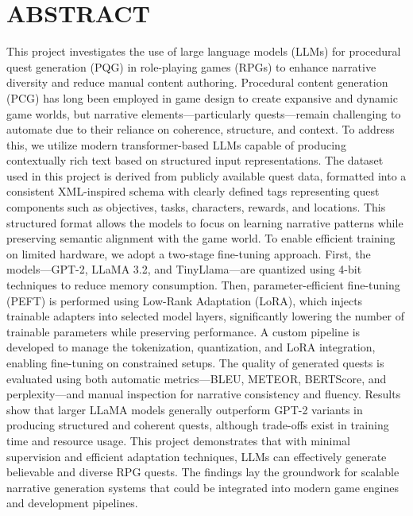 \clearpage

\section*{\centering \large ABSTRACT}

\vspace{2em}

\begin{doublespace}
  \justifying
  \noindent
  This project investigates the use of large language models (LLMs) for procedural quest
  generation (PQG) in role-playing games (RPGs) to enhance narrative diversity and reduce
  manual content authoring. Procedural content generation (PCG) has long been
  employed in game design to create expansive and dynamic game worlds, but narrative
  elements—particularly quests—remain challenging to automate due to their reliance on
  coherence, structure, and context. To address this, we utilize modern transformer-based
  LLMs capable of producing contextually rich text based on structured input representations.
  The dataset used in this project is derived from publicly available quest data,
  formatted into a consistent XML-inspired schema with clearly defined tags representing
  quest components such as objectives, tasks, characters, rewards, and locations. This structured
  format allows the models to focus on learning narrative patterns while preserving
  semantic alignment with the game world. To enable efficient training on limited hardware,
  we adopt a two-stage fine-tuning approach. First, the models—GPT-2, LLaMA 3.2,
  and TinyLlama—are quantized using 4-bit techniques to reduce memory consumption.
  Then, parameter-efficient fine-tuning (PEFT) is performed using Low-Rank Adaptation
  (LoRA), which injects trainable adapters into selected model layers, significantly lowering
  the number of trainable parameters while preserving performance. A custom pipeline
  is developed to manage the tokenization, quantization, and LoRA integration, enabling
  fine-tuning on constrained setups. The quality of generated quests is evaluated using
  both automatic metrics—BLEU, METEOR, BERTScore, and perplexity—and manual
  inspection for narrative consistency and fluency. Results show that larger LLaMA models
  generally outperform GPT-2 variants in producing structured and coherent quests,
  although trade-offs exist in training time and resource usage. This project demonstrates
  that with minimal supervision and efficient adaptation techniques, LLMs can effectively
  generate believable and diverse RPG quests. The findings lay the groundwork for scalable
  narrative generation systems that could be integrated into modern game engines and
  development pipelines.
\end{doublespace}

\newpage
